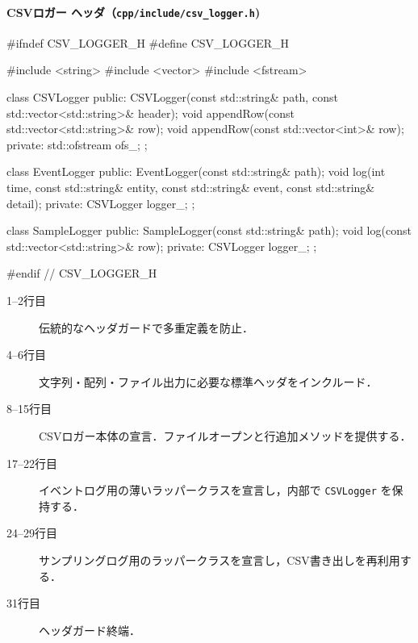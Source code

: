 \documentclass[10pt,letterpaper]{jsarticle}
\begin{document}
\paragraph{CSVロガー ヘッダ（\texttt{cpp/include/csv\_logger.h})}
\begin{cppcode}
#ifndef CSV_LOGGER_H
#define CSV_LOGGER_H

#include <string>
#include <vector>
#include <fstream>

class CSVLogger {
public:
    CSVLogger(const std::string& path, const std::vector<std::string>& header);
    void appendRow(const std::vector<std::string>& row);
    void appendRow(const std::vector<int>& row);
private:
    std::ofstream ofs_;
};

class EventLogger {
public:
    EventLogger(const std::string& path);
    void log(int time, const std::string& entity,
             const std::string& event, const std::string& detail);
private:
    CSVLogger logger_;
};

class SampleLogger {
public:
    SampleLogger(const std::string& path);
    void log(const std::vector<std::string>& row);
private:
    CSVLogger logger_;
};

#endif // CSV_LOGGER_H
\end{cppcode}
\begin{description}
  \item[1--2行目] 伝統的なヘッダガードで多重定義を防止．
  \item[4--6行目] 文字列・配列・ファイル出力に必要な標準ヘッダをインクルード．
  \item[8--15行目] CSVロガー本体の宣言．ファイルオープンと行追加メソッドを提供する．
  \item[17--22行目] イベントログ用の薄いラッパークラスを宣言し，内部で \texttt{CSVLogger} を保持する．
  \item[24--29行目] サンプリングログ用のラッパークラスを宣言し，CSV書き出しを再利用する．
  \item[31行目] ヘッダガード終端．
\end{description}
\end{document}
